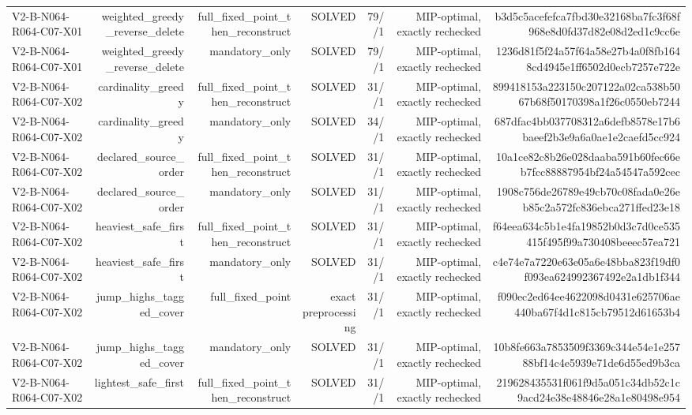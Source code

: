 {\begin{longtable}{lrrrrrr}
V2-B-N064-R064-C07-X01 & weighted\_greedy\_reverse\_delete & full\_fixed\_point\_then\_reconstruct & SOLVED & 79//1 & MIP-optimal, exactly rechecked & b3d5c5acefefca7fbd30e32168ba7fc3f68f968e8d0fd37d82e08d2ed1c9cc6e \\
V2-B-N064-R064-C07-X01 & weighted\_greedy\_reverse\_delete & mandatory\_only & SOLVED & 79//1 & MIP-optimal, exactly rechecked & 1236d81f5f24a57f64a58e27b4a0f8fb1648cd4945e1ff6502d0ecb7257e722e \\
V2-B-N064-R064-C07-X02 & cardinality\_greedy & full\_fixed\_point\_then\_reconstruct & SOLVED & 31//1 & MIP-optimal, exactly rechecked & 899418153a223150c207122a02ca538b5067b68f50170398a1f26c0550eb7244 \\
V2-B-N064-R064-C07-X02 & cardinality\_greedy & mandatory\_only & SOLVED & 34//1 & MIP-optimal, exactly rechecked & 687dfac4bb037708312a6defb8578e17b6baeef2b3e9a6a0ae1e2caefd5cc924 \\
V2-B-N064-R064-C07-X02 & declared\_source\_order & full\_fixed\_point\_then\_reconstruct & SOLVED & 31//1 & MIP-optimal, exactly rechecked & 10a1ce82c8b26e028daaba591b60fec66eb7fcc88887954bf24a54547a592cec \\
V2-B-N064-R064-C07-X02 & declared\_source\_order & mandatory\_only & SOLVED & 31//1 & MIP-optimal, exactly rechecked & 1908c756de26789e49cb70c08fada0e26eb85c2a572fc836ebca271ffed23e18 \\
V2-B-N064-R064-C07-X02 & heaviest\_safe\_first & full\_fixed\_point\_then\_reconstruct & SOLVED & 31//1 & MIP-optimal, exactly rechecked & f64eea634c5b1e4fa19852b0d3c7d0ce535415f495f99a730408beeec57ea721 \\
V2-B-N064-R064-C07-X02 & heaviest\_safe\_first & mandatory\_only & SOLVED & 31//1 & MIP-optimal, exactly rechecked & c4e74e7a7220e63e05a6e48bba823f19df0f093ea624992367492e2a1db1f344 \\
V2-B-N064-R064-C07-X02 & jump\_highs\_tagged\_cover & full\_fixed\_point & exact preprocessing & 31//1 & MIP-optimal, exactly rechecked & f090ec2ed64ee4622098d0431e625706ae440ba67f4d1c815cb79512d61653b4 \\
V2-B-N064-R064-C07-X02 & jump\_highs\_tagged\_cover & mandatory\_only & SOLVED & 31//1 & MIP-optimal, exactly rechecked & 10b8fe663a7853509f3369c344e54e1e25788bf14c4e5939e71de6d55ed9b3ca \\
V2-B-N064-R064-C07-X02 & lightest\_safe\_first & full\_fixed\_point\_then\_reconstruct & SOLVED & 31//1 & MIP-optimal, exactly rechecked & 219628435531f061f9d5a051c34db52c1c9acd24e38e48846e28a1e80498e954 \\

\end{longtable}}
